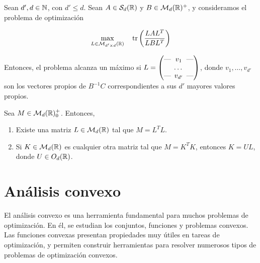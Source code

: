 \documentclass{book}
\begin{document}
\begin{thm} \label{thm:eigen_trace_ratio_opt}
	Sean $d',d \in \mathbb{N} $, con $d' \le d$. Sean $A \in \mathcal{S}_d(\mathbb{R})$ y $B \in \mathcal{M}_d(\mathbb{R})^+$, y consideramos el problema de optimización
	
	\begin{align*}
	\max_{L \in \mathcal{M}_{d'\times d}(\mathbb{R})} &\quad \operatorname{tr}\left(\frac{LAL^T}{LBL^T}\right)  \\
	\end{align*}
	
	Entonces, el problema alcanza un máximo si $L = \begin{pmatrix}
	\text{---} \hspace{-0.2cm} & v_1 & \hspace{-0.2cm} \text{---} \\
	& \dots &  \\
	\text{---} \hspace{-0.2cm} & v_{d'} & \hspace{-0.2cm} \text{---}
	\end{pmatrix}$, donde $v_1,\dots,v_{d'}$ son los vectores propios de $B^{-1}C$ correspondientes a sus $d'$ mayores valores propios.
	
	
\end{thm}



\begin{thm} \label{thm:psd_decomposition}
	Sea $M \in \mathcal{M}_d(\mathbb{R})^+_0$. Entonces,
	\begin{enumerate}
		\item Existe una matriz $L \in \mathcal{M}_d(\mathbb{R})$ tal que $M = L^TL$.
		\item Si $K \in \mathcal{M}_d(\mathbb{R})$ es cualquier otra matriz tal que $M = K^TK$, entonces $K = UL$, donde $U \in O_d(\mathbb{R})$.
	\end{enumerate}
\end{thm}

\chapter{Análisis convexo}

El análisis convexo es una herramienta fundamental para muchos problemas de optimización. En él, se estudian los conjuntos, funciones y problemas convexos. Las funciones convexas presentan propiedades muy útiles en tareas de optimización, y permiten construir herramientas para resolver numerosos tipos de problemas de optimización convexos.
\end{document}
